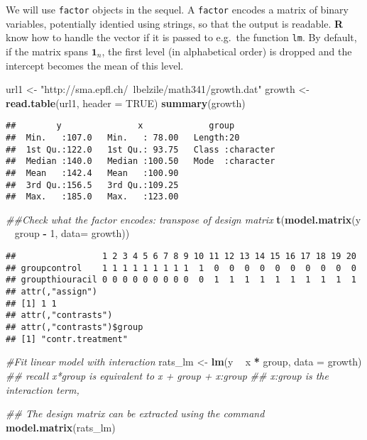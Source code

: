 \documentclass[]{book}
\newenvironment{Shaded}{\begin{snugshade}}{\end{snugshade}}
\newcommand{\CommentTok}[1]{\textcolor[rgb]{0.56,0.35,0.01}{\textit{#1}}}
\newcommand{\DataTypeTok}[1]{\textcolor[rgb]{0.13,0.29,0.53}{#1}}
\newcommand{\DecValTok}[1]{\textcolor[rgb]{0.00,0.00,0.81}{#1}}
\newcommand{\KeywordTok}[1]{\textcolor[rgb]{0.13,0.29,0.53}{\textbf{#1}}}
\newcommand{\NormalTok}[1]{#1}
\newcommand{\OperatorTok}[1]{\textcolor[rgb]{0.81,0.36,0.00}{\textbf{#1}}}
\newcommand{\OtherTok}[1]{\textcolor[rgb]{0.56,0.35,0.01}{#1}}
\newcommand{\StringTok}[1]{\textcolor[rgb]{0.31,0.60,0.02}{#1}}
\theoremstyle{definition}
\theoremstyle{definition}
\theoremstyle{definition}
\theoremstyle{remark}
\begin{document}
We will use \texttt{factor} objects in the sequel. A \texttt{factor} encodes a matrix of binary variables,
potentially identied using strings, so that the output is readable. \textbf{R} know how to handle the vector if it is passed to e.g.~the function \texttt{lm}. By default, if the matrix spans \(\mathbf{1}_n\), the first level (in alphabetical order) is dropped and the intercept becomes the mean of this level.

\begin{Shaded}
\begin{Highlighting}[]
\NormalTok{url1 <-}\StringTok{ "http://sma.epfl.ch/~lbelzile/math341/growth.dat"}
\NormalTok{growth <-}\StringTok{ }\KeywordTok{read.table}\NormalTok{(url1, }\DataTypeTok{header =} \OtherTok{TRUE}\NormalTok{)}
\KeywordTok{summary}\NormalTok{(growth)}
\end{Highlighting}
\end{Shaded}

\begin{verbatim}
##        y               x             group          
##  Min.   :107.0   Min.   : 78.00   Length:20         
##  1st Qu.:122.0   1st Qu.: 93.75   Class :character  
##  Median :140.0   Median :100.50   Mode  :character  
##  Mean   :142.4   Mean   :100.90                     
##  3rd Qu.:156.5   3rd Qu.:109.25                     
##  Max.   :185.0   Max.   :123.00
\end{verbatim}

\begin{Shaded}
\begin{Highlighting}[]
\CommentTok{##Check what the factor encodes: transpose of design matrix}
\KeywordTok{t}\NormalTok{(}\KeywordTok{model.matrix}\NormalTok{(y }\OperatorTok{~}\StringTok{ }\NormalTok{group }\OperatorTok{-}\StringTok{ }\DecValTok{1}\NormalTok{, }\DataTypeTok{data=}\NormalTok{ growth))}
\end{Highlighting}
\end{Shaded}

\begin{verbatim}
##                 1 2 3 4 5 6 7 8 9 10 11 12 13 14 15 16 17 18 19 20
## groupcontrol    1 1 1 1 1 1 1 1 1  1  0  0  0  0  0  0  0  0  0  0
## groupthiouracil 0 0 0 0 0 0 0 0 0  0  1  1  1  1  1  1  1  1  1  1
## attr(,"assign")
## [1] 1 1
## attr(,"contrasts")
## attr(,"contrasts")$group
## [1] "contr.treatment"
\end{verbatim}

\begin{Shaded}
\begin{Highlighting}[]
\CommentTok{#Fit linear model with interaction}
\NormalTok{rats_lm <-}\StringTok{ }\KeywordTok{lm}\NormalTok{(y }\OperatorTok{~}\StringTok{ }\NormalTok{x }\OperatorTok{*}\StringTok{ }\NormalTok{group, }\DataTypeTok{data =}\NormalTok{ growth)}
\CommentTok{## recall x*group is equivalent to x + group + x:group}
\CommentTok{## x:group is the interaction term,}

\CommentTok{## The design matrix can be extracted using the command}
\KeywordTok{model.matrix}\NormalTok{(rats_lm)}
\end{Highlighting}
\end{Shaded}
\end{document}
